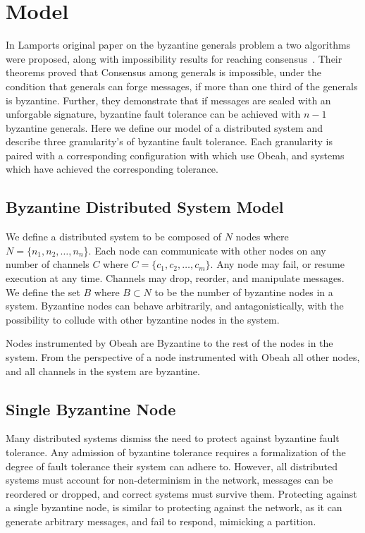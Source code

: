 \section{Model}
\label{sec:model}

In Lamports original paper on the byzantine generals problem a two algorithms
were proposed, along with impossibility results for reaching
consensus~\cite{Lamport:1982:BGP:357172.357176}. Their theorems proved that
Consensus among generals is impossible, under the condition that generals can
forge messages, if more than one third of the generals is byzantine. Further,
they demonstrate that if messages are sealed with an unforgable signature,
byzantine fault tolerance can be achieved with $n-1$ byzantine generals. Here
we define our model of a distributed system and describe three granularity's of
byzantine fault tolerance. Each granularity is paired with a corresponding
configuration with which use Obeah, and systems which have achieved the
corresponding tolerance.

\subsection{Byzantine Distributed System Model}

We define a distributed system to be composed of $N$ nodes where $N = \{n_1,
n_2, \dots, n_n$\}. Each node can communicate with other nodes on any number of
channels $C$ where $C = \{c_1, c_2, \dots, c_m\}$. Any node may fail, or resume
execution at any time. Channels may drop, reorder, and manipulate messages. We
define the set $B$ where $B \subset N$ to be the number of byzantine nodes in a
system. Byzantine nodes can behave arbitrarily, and antagonistically, with the
possibility to collude with other byzantine nodes in the system.

Nodes instrumented by Obeah are Byzantine to the rest of the nodes in the
system. From the perspective of a node instrumented with Obeah all other nodes,
and all channels in the system are byzantine.


\subsection{Single Byzantine Node}

Many distributed systems dismiss the need to protect against byzantine fault
tolerance. Any admission of byzantine tolerance requires a formalization of the
degree of fault tolerance their system can adhere to. However, all distributed
systems must account for non-determinism in the network, messages can be
reordered or dropped, and correct systems must survive them. Protecting against
a single byzantine node, is similar to protecting against the network, as it
can generate arbitrary messages, and fail to respond, mimicking a partition.

